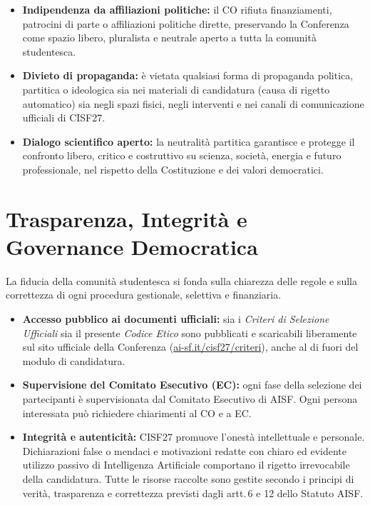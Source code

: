 \documentclass[10pt,a4paper]{article}
\begin{document}
\begin{itemize}
  \item \textbf{Indipendenza da affiliazioni politiche:} il CO rifiuta finanziamenti, patrocini di parte o affiliazioni politiche dirette, preservando la Conferenza come spazio libero, pluralista e neutrale aperto a tutta la comunità studentesca.
  \item \textbf{Divieto di propaganda:} è vietata qualsiasi forma di propaganda politica, partitica o ideologica sia nei materiali di candidatura (causa di rigetto automatico) sia negli spazi fisici, negli interventi e nei canali di comunicazione ufficiali di CISF27.
  \item \textbf{Dialogo scientifico aperto:} la neutralità partitica garantisce e protegge il confronto libero, critico e costruttivo su scienza, società, energia e futuro professionale, nel rispetto della Costituzione e dei valori democratici.
\end{itemize}

\section{Trasparenza, Integrità e Governance Democratica}

La fiducia della comunità studentesca si fonda sulla chiarezza delle regole e sulla correttezza di ogni procedura gestionale, selettiva e finanziaria.

\begin{itemize}
  \item \textbf{Accesso pubblico ai documenti ufficiali:} sia i \textit{Criteri di Selezione Ufficiali} sia il presente \textit{Codice Etico} sono pubblicati e scaricabili liberamente sul sito ufficiale della Conferenza (\href{https://ai-sf.it/cisf27/criteri}{ai-sf.it/cisf27/criteri}), anche al di fuori del modulo di candidatura.
  \item \textbf{Supervisione del Comitato Esecutivo (EC):} ogni fase della selezione dei partecipanti è supervisionata dal Comitato Esecutivo di AISF. Ogni persona interessata può richiedere chiarimenti al CO e a EC.
  \item \textbf{Integrità e autenticità:} CISF27 promuove l'onestà intellettuale e personale. Dichiarazioni false o mendaci e motivazioni redatte con chiaro ed evidente utilizzo passivo di Intelligenza Artificiale comportano il rigetto irrevocabile della candidatura. Tutte le risorse raccolte sono gestite secondo i principi di verità, trasparenza e correttezza previsti dagli artt.\,6 e 12 dello Statuto AISF.
\end{itemize}
\end{document}
